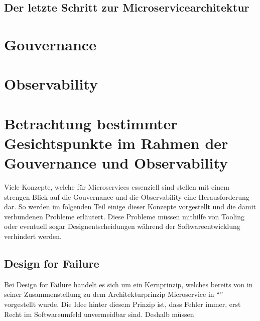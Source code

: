 \subsection{Der letzte Schritt zur Microservicearchitektur}

\section{Gouvernance}
\section{Observability}

\section{Betrachtung bestimmter Gesichtspunkte im Rahmen der Gouvernance und Observability}

Viele Konzepte, welche für Microservices essenziell sind stellen mit einem strengen Blick auf die Gouvernance und die Observability eine Herausforderung dar. So werden im folgenden Teil einige dieser Konzepte vorgestellt und die damit verbundenen Probleme erläutert. Diese Probleme müssen mithilfe von Tooling oder eventuell sogar Designentscheidungen während der Softwareentwicklung verhindert werden.

\subsection{Design for Failure}
Bei Design for Failure \autocite{FowlerMicrservices} handelt es sich um ein Kernprinzip, welches bereits von \citeauthor{FowlerMicrservices} in seiner Zusammenstellung zu dem Architekturprinzip Microservice in \enquote{} vorgestellt wurde. Die Idee hinter diesem Prinzip ist, dass Fehler immer, erst Recht im Softwareumfeld unvermeidbar sind. Deshalb müssen 


